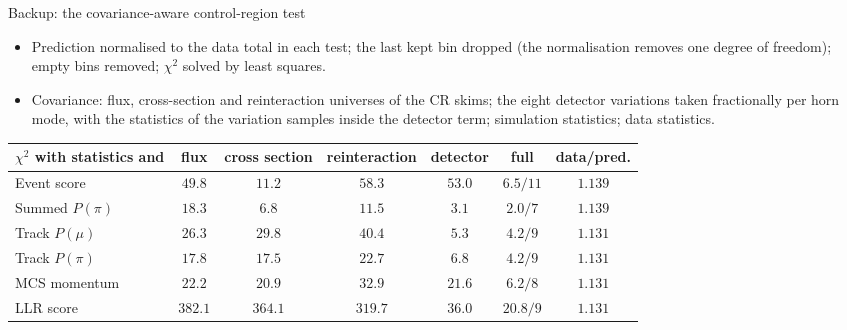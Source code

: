 \documentclass[aspectratio=169,10pt]{beamer}
\begin{document}
\begin{frame}{Backup: the covariance-aware control-region test}
  \begin{itemize}\footnotesize\setlength\itemsep{3pt}
    \item Prediction normalised to the data total in each test; the last kept bin dropped (the normalisation
          removes one degree of freedom); empty bins removed; $\chi^2$ solved by least squares.
    \item Covariance: flux, cross-section and reinteraction universes of the CR skims; the eight detector
          variations taken fractionally per horn mode, with the statistics of the variation samples inside
          the detector term; simulation statistics; data statistics.
  \end{itemize}
  \vspace{1mm}
  \begin{center}\scriptsize\setlength{\tabcolsep}{4pt}
  \begin{tabular}{lcccccc}
    \toprule
    $\chi^2$ with statistics and & flux & cross section & reinteraction & detector & full & data/pred. \\
    \midrule
    Event score    & $49.8$ & $11.2$ & $58.3$ & $53.0$ & $6.5/11$ & $1.139$ \\
    Summed $P(\pi)$ & $18.3$ & $6.8$ & $11.5$ & $3.1$ & $2.0/7$ & $1.139$ \\
    Track $P(\mu)$ & $26.3$ & $29.8$ & $40.4$ & $5.3$ & $4.2/9$ & $1.131$ \\
    Track $P(\pi)$ & $17.8$ & $17.5$ & $22.7$ & $6.8$ & $4.2/9$ & $1.131$ \\
    MCS momentum   & $22.2$ & $20.9$ & $32.9$ & $21.6$ & $6.2/8$ & $1.131$ \\
    LLR score      & $382.1$ & $364.1$ & $319.7$ & $36.0$ & $20.8/9$ & $1.131$ \\
    \bottomrule
  \end{tabular}
  \end{center}
\end{frame}
\end{document}
